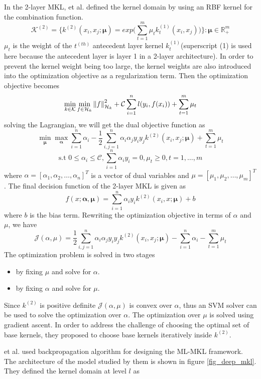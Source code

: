 In the 2-layer MKL, \cite{2l_mkl} et al. defined the kernel domain by using an RBF kernel for the combination function. 
\[ \mathcal{K}^{(2)} = \bigg\{ k^{(2)}(x_i, x_j;\bm{\mu}) = exp\Big( \sum_{t=1}^m \mu_t k_t^{(1)}(x_i, x_j) \Big)  \bigg\}  \colon \bm{\mu} \in \mathbb{R}_+^m \]
$\mu_t$ is the weight of the $t^{(th)}$ antecedent layer kernel $k_t^{(1)}$(superscript (1) is used here because the antecedent layer is layer 1 in a 2-layer architecture). In order to prevent the kernel weight being too large, the kernel weights are also introduced into the optimization objective as a regularization term. Then the optimization objective becomes
\begin{equation}
\min_{k \in \mathcal{K}} \min_{f \in \mathcal{H}_k} \left\lVert f\right\rVert^2_{\mathcal{H}_k} + \mathcal{C} \sum_{i=1}^n l(y_i, f(x_i)) + \sum_{t=1}^m \mu_t
\end{equation}
solving the Lagrangian, we will get the dual objective function as
\[ \min_{\bm{\mu}} \max_{\bm{\alpha}} \sum_{i=1}^n \alpha_i - \frac{1}{2}\sum_{i,j=1}^n \alpha_i \alpha_j y_i y_j k^{(2)}(x_i, x_j;\bm{\mu}) + \sum_{t=1}^m \mu_t \]
\[ \textrm{s.t } 0\leq \alpha_i\leq \mathcal{C}, \sum_{i=1}^n \alpha_i y_i = 0, \mu_t \geq 0, t=1, \ldots, m \]
where $\alpha = [\alpha_1, \alpha_2, \ldots, \alpha_n]^T$ is a vector of dual variables and $\mu = [\mu_1, \mu_2, \ldots, \mu_m]^T$. The final decision function of the 2-layer MKL is given as
\[f(x;\bm{\alpha}, \bm{\mu}) = \sum_{i=1}^n \alpha_i y_i k^{(2)}(x_i, x;\bm{\mu}) + b \]
where $b$ is the bias term. Rewriting the optimization objective in terms of $\alpha$ and $\mu$, we have
\[ \mathcal{J}(\alpha, \mu) = \frac{1}{2} \sum_{i,j=1}^n \alpha_i \alpha_j y_i y_j k^{(2)}(x_i, x_j;\bm{\mu}) - \sum_{i=1}^n \alpha_i - \sum_{t=1}^m \mu_t \]
The optimization problem is solved in two stages
\begin{itemize}
\item by fixing $\mu$ and solve for $\alpha$.
\item by fixing $\alpha$ and solve for $\mu$.
\end{itemize}
Since $k^{(2)}$ is positive definite $\mathcal{J}(\alpha, \mu)$ is convex over $\alpha$, thus an SVM solver can be used to solve the optimization over $\alpha$. The optimization over $\mu$ is solved using gradient ascent. In order to address the challenge of choosing the optimal set of base kernels, they proposed to choose base kernels iteratively inside $k^{(2)}$.

\cite{deep_mkl} et al. used backpropagation algorithm for designing the ML-MKL framework. The architecture of the model studied by them is shown in figure \ref{fig_deep_mkl}. They defined the kernel domain at level $l$ as

